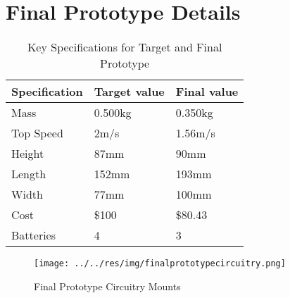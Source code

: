 \documentclass[class=../../report, crop=false]{standalone}
\begin{document}
\section{Final Prototype Details} \label{app:finaldetails}

\begin{table}[H]
	\centering
	\begin{tabular}{l | l | l}
		Specification & Target value & Final value \\ \hline
		Mass & 0.500kg & 0.350kg \\
		Top Speed & 2m/s & 1.56m/s \\
		Height & 87mm & 90mm \\
		Length & 152mm & 193mm \\
		Width & 77mm & 100mm \\
		Cost & \$100 & \$80.43 \\
		Batteries & 4 & 3 \\
	\end{tabular}
	\caption{Key Specifications for Target and Final Prototype}
	\label{app/table:targets}
\end{table}

\begin{figure}[H]
	\centering
	\texttt{[image: ../../res/img/finalprototypecircuitry.png]}
	\caption{Final Prototype Circuitry Mounts}
	\label{app/fig:finalprototypecircuitry}
\end{figure}
\end{document}
